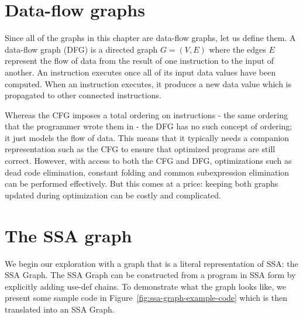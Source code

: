 \section{Data-flow graphs}
Since all of the graphs in this chapter are data-flow graphs, let us define them. A data-flow graph (DFG) is a directed graph $G=(V,E)$ where the edges $E$ represent the flow of data from the result of one instruction to the input of another. 
An instruction executes once all of its input data values have been computed. When an instruction executes, it produces a new data value which is propagated to other connected instructions.

Whereas the CFG imposes a total ordering on instructions - the same ordering that the programmer wrote them in - the DFG has no such concept of ordering; it just models the flow of data. This means that it typically needs a companion representation such as the CFG to ensure that optimized programs are still correct.
However, with access to both the CFG and DFG, optimizations such as dead code elimination, constant folding and common subexpression elimination can be performed effectively. But this comes at a price: keeping both graphs updated during optimization can be costly and complicated. 

\section{The SSA graph}

We begin our exploration with a graph that is a literal representation of SSA: the SSA Graph. 
The SSA Graph can be constructed from a program in SSA form by explicitly adding use-def chains. 
To demonstrate what the graph looks like, we present some sample code in Figure~\ref{fig:ssa-graph-example-code} which is then translated into an SSA Graph.

